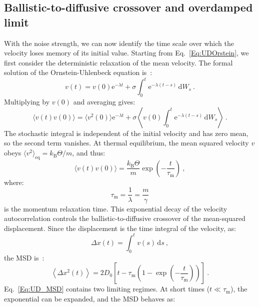 \subsection{Ballistic-to-diffusive crossover and overdamped limit}
With the noise strength, we can now identify the time scale over which the velocity loses memory of its initial value. Starting from Eq.~\ref{Eq:UDOrstein}, we first consider the deterministic relaxation of the mean velocity. The formal solution of the Ornstein-Uhlenbeck equation is~\cite{chandrasekhar1943stochastic}:
\begin{equation}
    v(t) = v(0)\mathrm{e}^{-\lambda t} + \sigma \int_0^t \mathrm{e}^{-\lambda(t-s)}\,\mathrm{d}W_s~.
\end{equation}
Multiplying by $v(0)$ and averaging gives:
\begin{equation}
    \langle v(t)v(0)\rangle = \langle v^2(0)\rangle \mathrm{e}^{-\lambda t} + \sigma \left\langle v(0) \int_0^t \mathrm{e}^{-\lambda(t-s)}\,\mathrm{d}W_s \right\rangle~.
\end{equation}
The stochastic integral is independent of the initial velocity and has zero mean, so the second term vanishes. At thermal equilibrium, the mean squared velocity $v$ obeys $\langle v^2\rangle_\mathrm{eq}=k_\mathrm{B}\Theta/m$, and thus:
\begin{equation}
    \boxed{\langle v(t)v(0)\rangle=\dfrac{k_\mathrm{B}\Theta}{m}\exp\left(-\dfrac{t}{\tau_\mathrm{m}}\right)}~,
    \label{ballistic_msd_1}
\end{equation}
where:
\begin{equation}
    \tau_\mathrm{m}=\dfrac{1}{\lambda}=\dfrac{m}{\gamma}
    \label{taum}
\end{equation}
is the momentum relaxation time. This exponential decay of the velocity autocorrelation controls the ballistic-to-diffusive crossover of the mean-squared displacement. Since the displacement is the time integral of the velocity, as:
\begin{equation}
    \Delta x(t)=\int_0^t v(s)\,\mathrm{d}s~,
    \label{ballistic_msd_2}
\end{equation}
the MSD is~\cite{chandrasekhar1943stochastic}:
\begin{equation}
    \left\langle \Delta x^2(t)\right\rangle = 2D_0\left[t-\tau_\mathrm{m} \left(1-\exp\left(-\dfrac{t}{\tau_\mathrm{m}}\right)\right) \right]~.
    \label{Eq:UD_MSD}
\end{equation}
Eq.~\ref{Eq:UD_MSD} contains two limiting regimes. At short times ($t \ll \tau_\mathrm{m}$), the exponential can be expanded, and the MSD behaves as:
